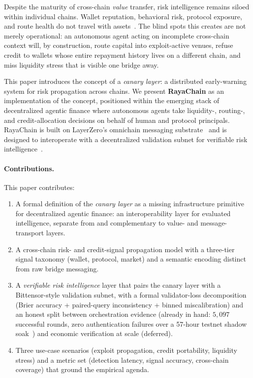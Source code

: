 \documentclass[journal]{IEEEtran}
\begin{document}
Despite the maturity of cross-chain \emph{value} transfer, risk
intelligence remains siloed within individual chains. Wallet
reputation, behavioral risk, protocol exposure, and route health do
not travel with assets~\cite{HasanBB23}. The blind spots this creates
are not merely operational: an autonomous agent acting on incomplete
cross-chain context will, by construction, route capital into
exploit-active venues, refuse credit to wallets whose entire repayment
history lives on a different chain, and miss liquidity stress that is
visible one bridge away.

This paper introduces the concept of a \textit{canary layer}: a
distributed early-warning system for risk propagation across chains.
We present \textbf{RayaChain} as an implementation of the concept,
positioned within the emerging stack of decentralized agentic finance
where autonomous agents take liquidity-, routing-, and credit-allocation
decisions on behalf of human and protocol principals. RayaChain is
built on LayerZero's omnichain messaging
substrate~\cite{abs-2110-13871} and is designed to interoperate with a
decentralized validation subnet for verifiable risk
intelligence~\cite{rao2021bittensor,steeves2022incentivizing,opentensor2024yuma}.

\paragraph*{Contributions.}
This paper contributes:
\begin{enumerate}
\item A formal definition of the \emph{canary layer} as a missing
      infrastructure primitive for decentralized agentic finance: an
      interoperability layer for evaluated intelligence, separate from
      and complementary to value- and message-transport layers.
\item A cross-chain risk- and credit-signal propagation model with a
      three-tier signal taxonomy (wallet, protocol, market) and a
      semantic encoding distinct from raw bridge messaging.
\item A \emph{verifiable risk intelligence} layer that pairs the canary
      layer with a Bittensor-style validation subnet, with a formal
      validator-loss decomposition (Brier accuracy + paired-query
      inconsistency + binned miscalibration) and an honest split between
      orchestration evidence (already in hand: $5{,}097$ successful
      rounds, zero authentication failures over a 57-hour testnet
      shadow soak~\cite{omnirisk2026soak}) and economic verification at
      scale (deferred).
\item Three use-case scenarios (exploit propagation, credit
      portability, liquidity stress) and a metric set (detection
      latency, signal accuracy, cross-chain coverage) that ground the
      empirical agenda.
\end{enumerate}
\end{document}
